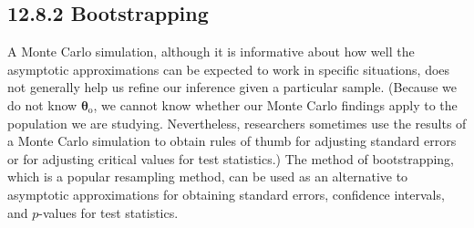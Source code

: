 \documentclass[10pt]{article}
\begin{document}
\subsection*{12.8.2 Bootstrapping}
A Monte Carlo simulation, although it is informative about how well the asymptotic approximations can be expected to work in specific situations, does not generally help us refine our inference given a particular sample. (Because we do not know $\boldsymbol{\theta}_{\mathrm{o}}$, we cannot know whether our Monte Carlo findings apply to the population we are studying. Nevertheless, researchers sometimes use the results of a Monte Carlo simulation to obtain rules of thumb for adjusting standard errors or for adjusting critical values for test statistics.) The method of bootstrapping, which is a popular resampling method, can be used as an alternative to asymptotic approximations for obtaining standard errors, confidence intervals, and $p$-values for test statistics.
\end{document}
